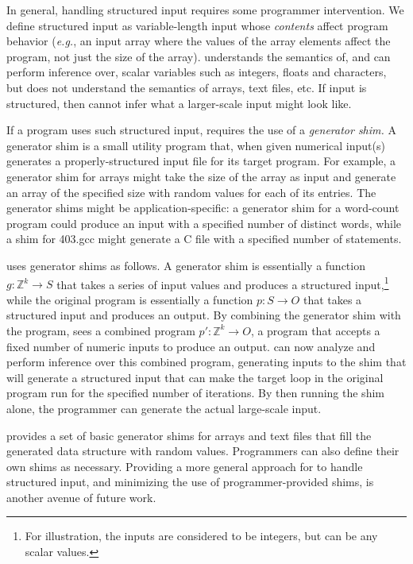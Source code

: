 In general, handling structured input requires some programmer intervention.
We define structured input as variable-length input whose {\em contents}
affect program behavior ({\em e.g.}, an input array where the values of the
array elements affect the program, not just the size of the array). \lancet
understands the semantics of, and can perform inference over, scalar variables
such as integers, floats and characters, but does not understand the semantics
of arrays, text files, etc. If input is structured, then \lancet cannot infer
what a larger-scale input might look like.

If a program uses such structured input, \lancet requires the use of a {\em
generator shim.} A generator shim is a small utility program that, when given
numerical input(s) generates a properly-structured input file for its target
program. For example, a generator shim for arrays might take the size of the
array as input and generate an array of the specified size with random values
for each of its entries. The generator shims might be application-specific: a
generator shim for a word-count program could produce an input with a
specified number of distinct words, while a shim for 403.gcc might generate a
C file with a specified number of statements.

\lancet uses generator shims as follows. A generator shim is essentially a
function $g: \mathbb{Z}^k \rightarrow S$ that takes a series of input values
and produces a structured input,\footnote{For illustration, the inputs are
considered to be integers, but can be any scalar values.} while the original
program is essentially a function $p: S \rightarrow O$ that takes a structured
input and produces an output. By combining the generator shim with the
program, \lancet sees a combined program $p': \mathbb{Z}^k \rightarrow O$, a
program that accepts a fixed number of numeric inputs to produce an output.
\lancet can now analyze and perform inference over this combined program,
generating inputs to the shim that will generate a structured input that can
make the target loop in the original program run for the specified number of
iterations. By then running the shim alone, the programmer can generate the
actual large-scale input.

\lancet provides a set of basic generator shims for arrays and text files that
fill the generated data structure with random values. Programmers can also
define their own shims as necessary. Providing a more general approach for
\lancet to handle structured input, and minimizing the use of
programmer-provided shims, is another avenue of future work.
